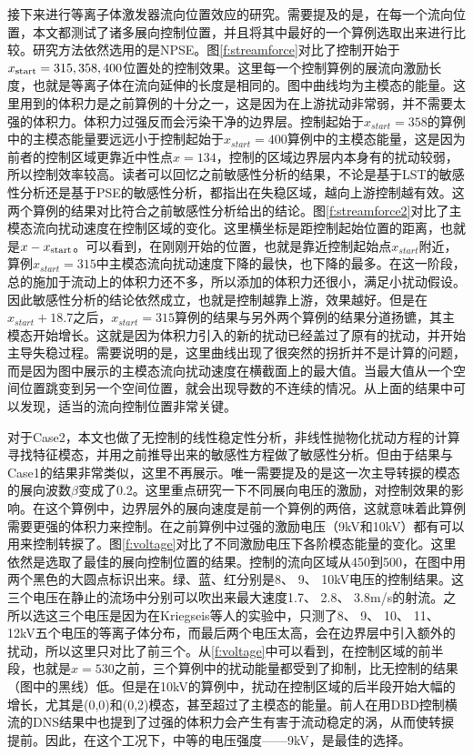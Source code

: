 接下来进行等离子体激发器流向位置效应的研究。需要提及的是，在每一个流向位置，本文都测试了诸多展向控制位置，并且将其中最好的一个算例选取出来进行比较。研究方法依然选用的是NPSE。图\ref{f:streamforce}对比了控制开始于$x_{\rm start}=315, 358, 400$位置处的控制效果。这里每一个控制算例的展流向激励长度，也就是等离子体在流向延伸的长度是相同的。图中曲线均为主模态的能量。这里用到的体积力是之前算例的十分之一，这是因为在上游扰动非常弱，并不需要太强的体积力。体积力过强反而会污染干净的边界层。控制起始于$x_{start}=358$的算例中的主模态能量要远远小于控制起始于$x_{start}=400$算例中的主模态能量，这是因为前者的控制区域更靠近中性点$x=134$，控制的区域边界层内本身有的扰动较弱，所以控制效率较高。读者可以回忆之前敏感性分析的结果，不论是基于LST的敏感性分析还是基于PSE的敏感性分析，都指出在失稳区域，越向上游控制越有效。这两个算例的结果对比符合之前敏感性分析给出的结论。图\ref{f:streamforce2}对比了主模态流向扰动速度在控制区域的变化。这里横坐标是距控制起始位置的距离，也就是$x-x_{\rm start}$。可以看到，在刚刚开始的位置，也就是靠近控制起始点$x_{start}$附近，算例$x_{start}=315$中主模态流向扰动速度下降的最快，也下降的最多。在这一阶段，总的施加于流动上的体积力还不多，所以添加的体积力还很小，满足小扰动假设。因此敏感性分析的结论依然成立，也就是控制越靠上游，效果越好。但是在$x_{start}+18.7$之后，$x_{start}=315$算例的结果与另外两个算例的结果分道扬镳，其主模态开始增长。这就是因为体积力引入的新的扰动已经盖过了原有的扰动，并开始主导失稳过程。需要说明的是，这里曲线出现了很突然的拐折并不是计算的问题，而是因为图中展示的主模态流向扰动速度在横截面上的最大值。当最大值从一个空间位置跳变到另一个空间位置，就会出现导数的不连续的情况。从上面的结果中可以发现，适当的流向控制位置非常关键。

对于Case2，本文也做了无控制的线性稳定性分析，非线性抛物化扰动方程的计算寻找特征模态，并用之前推导出来的敏感性方程做了敏感性分析。但由于结果与Case1的结果非常类似，这里不再展示。唯一需要提及的是这一次主导转捩的模态的展向波数$\beta$变成了0.2。这里重点研究一下不同展向电压的激励，对控制效果的影响。在这个算例中，边界层外的展向速度是前一个算例的两倍，这就意味着此算例需要更强的体积力来控制。在之前算例中过强的激励电压（9kV和10kV）都有可以用来控制转捩了。图\ref{f:voltage}对比了不同激励电压下各阶模态能量的变化。这里依然是选取了最佳的展向控制位置的结果。控制的流向区域从450到500，在图中用两个黑色的大圆点标识出来。绿、蓝、红分别是8、 9、 10kV电压的控制结果。这三个电压在静止的流场中分别可以吹出来最大速度1.7、 2.8、 3.8m/s的射流。之所以选这三个电压是因为在Kriegseis等人\cite{kriegseis2013velocity}的实验中，只测了8、 9、 10、 11、 12kV五个电压的等离子体分布，而最后两个电压太高，会在边界层中引入额外的扰动，所以这里只对比了前三个。从\ref{f:voltage}中可以看到，在控制区域的前半段，也就是$x = 530$之前，三个算例中的扰动能量都受到了抑制，比无控制的结果（图中的黑线）低。但是在10kV的算例中，扰动在控制区域的后半段开始大幅的增长，尤其是(0,0)和(0,2)模态，甚至超过了主模态的能量。前人在用DBD控制横流的DNS结果\cite{dorr2016}中也提到了过强的体积力会产生有害于流动稳定的涡，从而使转捩提前。因此，在这个工况下，中等的电压强度——9kV，是最佳的选择。

